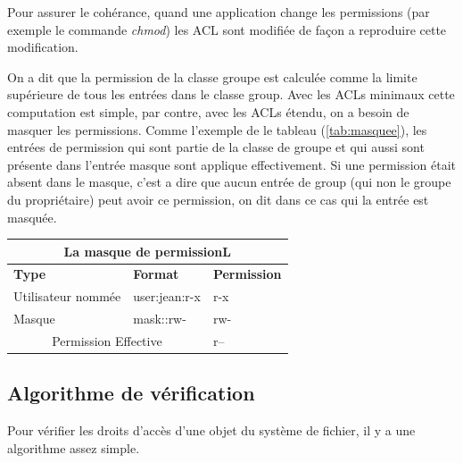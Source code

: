  
Pour assurer le cohérance, quand une application change les permissions (par exemple le commande \emph{chmod}) les ACL sont modifiée de façon a reproduire cette modification.
 
On a dit que la permission de la classe groupe est calculée comme la limite supérieure de tous les entrées dans le classe group. Avec les ACLs minimaux cette computation est simple, par contre, avec les ACLs étendu, on a besoin de masquer les permissions. Comme l'exemple de le tableau (\ref{tab:masquee}), les entrées de permission qui sont partie de la classe de groupe et qui aussi sont présente dans l'entrée masque sont applique effectivement. Si une permission était absent dans le masque, c'est a dire que aucun entrée de group (qui non le groupe du propriétaire) peut avoir ce permission, on dit dans ce cas qui la entrée est masquée.
 
\begin{center}
\begin{tabular}{|l|l|l|}
  \hline
    \multicolumn{3}{|c|}{La masque de permissionL} \\
  \hline
\textbf{Type} & \textbf{Format} & \textbf{Permission} \\
  \hline
Utilisateur nommée & user:jean:r-x & r-x\\
  \hline
Masque & mask::rw- & rw-\\
  \hline
\multicolumn{2}{|c|}{Permission Effective} & r--\\
  \hline
\end{tabular}
\label{tab:masque}
\end{center}
 
\subsection*{Algorithme de vérification}
 
Pour vérifier les droits d'accès d'une objet du système de fichier, il y a une algorithme assez simple.
 
